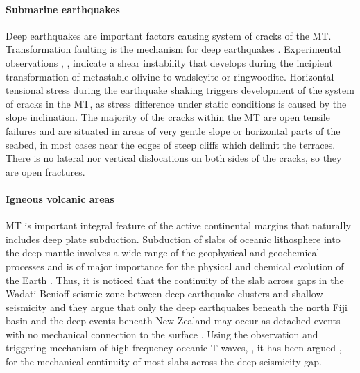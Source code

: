 \documentclass[11pt,a4paper]{report}
\begin{document}
\paragraph{Submarine earthquakes}
Deep earthquakes are important factors causing system of cracks of the \ac{MT}. Transformation faulting is the mechanism for deep earthquakes \cite{Kirbyetal1996}. Experimental observations \cite{GreenBurnley1989}, \cite{BurnleyGreen1991}, \cite{Kirbyetal1991} indicate a shear instability that develops during the incipient transformation of metastable olivine to wadsleyite or ringwoodite. Horizontal tensional stress during the earthquake shaking triggers development of the system of cracks in the \ac{MT}, as stress difference under static conditions is caused by the slope inclination. The majority of the cracks within the \ac{MT} are open tensile failures and are situated in areas of very gentle slope or horizontal parts of the seabed, in most cases near the edges of steep cliffs which delimit the terraces. There is no lateral nor vertical dislocations on both sides of the cracks, so they are open fractures.

\paragraph{Igneous volcanic areas}
\ac{MT} is important integral feature of the active continental margins that naturally includes deep plate subduction. Subduction of slabs of oceanic lithosphere into the deep mantle involves a wide range of the geophysical and geochemical processes and is of major importance for the physical and chemical evolution of the Earth \cite{Milleretal2004}. Thus, it is noticed \cite{IsacksMolnar1971} that the continuity of the slab across gaps in the Wadati-Benioff seismic zone between deep earthquake clusters and shallow seismicity and they argue that only the deep earthquakes beneath the north Fiji basin and the deep events beneath New Zealand may occur as detached events with no mechanical connection to the surface \cite{Lemenkova202022}. Using the observation and triggering mechanism of high-frequency oceanic T-waves, \cite{Barazangietal1972}, it has been argued \cite{GubbinsSnieder1991}, \cite{HilstSeno1993} for the mechanical continuity of most slabs across the deep seismicity gap.
\end{document}
